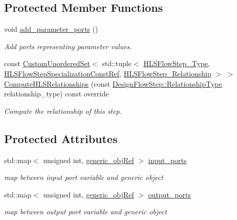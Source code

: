 \subsection*{Protected Member Functions}
\begin{DoxyCompactItemize}
\item 
void \hyperlink{classconn__binding__creator_a82010cffa9f6621f20ad7be071dc83c7}{add\+\_\+parameter\+\_\+ports} ()
\begin{DoxyCompactList}\small\item\em Add ports representing parameter values. \end{DoxyCompactList}\item 
const \hyperlink{classCustomUnorderedSet}{Custom\+Unordered\+Set}$<$ std\+::tuple$<$ \hyperlink{hls__step_8hpp_ada16bc22905016180e26fc7e39537f8d}{H\+L\+S\+Flow\+Step\+\_\+\+Type}, \hyperlink{hls__step_8hpp_a5fdd2edf290c196531d21d68e13f0e74}{H\+L\+S\+Flow\+Step\+Specialization\+Const\+Ref}, \hyperlink{hls__step_8hpp_a3ad360b9b11e6bf0683d5562a0ceb169}{H\+L\+S\+Flow\+Step\+\_\+\+Relationship} $>$ $>$ \hyperlink{classconn__binding__creator_a4e1f943323e06ccd6148578c17b53169}{Compute\+H\+L\+S\+Relationships} (const \hyperlink{classDesignFlowStep_a723a3baf19ff2ceb77bc13e099d0b1b7}{Design\+Flow\+Step\+::\+Relationship\+Type} relationship\+\_\+type) const override
\begin{DoxyCompactList}\small\item\em Compute the relationship of this step. \end{DoxyCompactList}\end{DoxyCompactItemize}
\subsection*{Protected Attributes}
\begin{DoxyCompactItemize}
\item 
std\+::map$<$ unsigned int, \hyperlink{generic__obj_8hpp_acb533b2ef8e0fe72e09a04d20904ca81}{generic\+\_\+obj\+Ref} $>$ \hyperlink{classconn__binding__creator_ae0e0355179dfa05ad0ee3cfd84d10366}{input\+\_\+ports}
\begin{DoxyCompactList}\small\item\em map between input port variable and generic object \end{DoxyCompactList}\item 
std\+::map$<$ unsigned int, \hyperlink{generic__obj_8hpp_acb533b2ef8e0fe72e09a04d20904ca81}{generic\+\_\+obj\+Ref} $>$ \hyperlink{classconn__binding__creator_af520959bd65e1b4024be9fc0837c9d52}{output\+\_\+ports}
\begin{DoxyCompactList}\small\item\em map between output port variable and generic object \end{DoxyCompactList}\end{DoxyCompactItemize}
